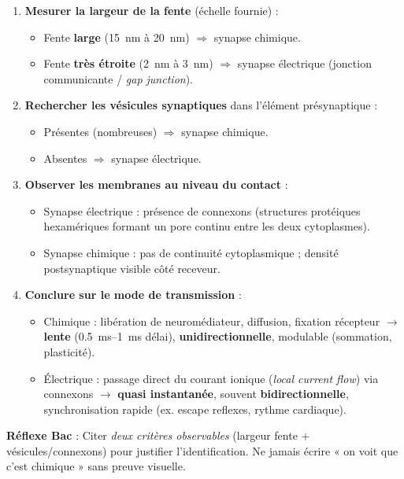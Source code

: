 \documentclass[11pt]{article}
\newcommand{\cle}[1]{{\popxbold\color{popdark}#1}}
\begin{document}
\begin{methode}
\begin{enumerate}
\item \textbf{Mesurer la largeur de la fente} (échelle fournie) :
\begin{itemize}
\item Fente \textbf{large} (\SI{15}{nm} à \SI{20}{nm}) $\Rightarrow$ \cle{synapse chimique}.
\item Fente \textbf{très étroite} (\SI{2}{nm} à \SI{3}{nm}) $\Rightarrow$ \cle{synapse électrique} (jonction communicante / \emph{gap junction}).
\end{itemize}
\item \textbf{Rechercher les vésicules synaptiques} dans l'élément présynaptique :
\begin{itemize}
\item Présentes (nombreuses) $\Rightarrow$ synapse chimique.
\item Absentes $\Rightarrow$ synapse électrique.
\end{itemize}
\item \textbf{Observer les membranes au niveau du contact} :
\begin{itemize}
\item Synapse électrique : présence de \cle{connexons} (structures protéiques hexamériques formant un pore continu entre les deux cytoplasmes).
\item Synapse chimique : pas de continuité cytoplasmique ; densité postsynaptique visible côté receveur.
\end{itemize}
\item \textbf{Conclure sur le mode de transmission} :
\begin{itemize}
\item Chimique : libération de neuromédiateur, diffusion, fixation récepteur $\rightarrow$ \textbf{lente} (\SI{0.5}{ms}--\SI{1}{ms} délai), \textbf{unidirectionnelle}, modulable (sommation, plasticité).
\item Électrique : passage direct du courant ionique (\emph{local current flow}) via connexons $\rightarrow$ \textbf{quasi instantanée}, souvent \textbf{bidirectionnelle}, synchronisation rapide (ex. escape reflexes, rythme cardiaque).
\end{itemize}
\end{enumerate}
\textbf{Réflexe Bac} : Citer \emph{deux critères observables} (largeur fente + vésicules/connexons) pour justifier l'identification. Ne jamais écrire « on voit que c'est chimique » sans preuve visuelle.
\end{methode}
\end{document}
